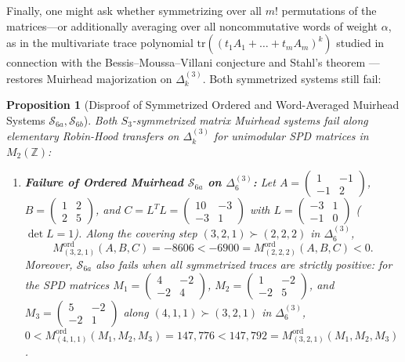 \documentclass[11pt,a4paper]{article}
\newtheorem{proposition}[theorem]{Proposition}
\theoremstyle{definition}
\theoremstyle{remark}
\newcommand{\tr}{\mathrm{tr}}
\newcommand{\DeltaLat}{\Delta}
\newcommand{\Mord}{M^{\mathrm{ord}}}
\begin{document}
Finally, one might ask whether symmetrizing over all $m!$ permutations of the matrices---or additionally averaging over all noncommutative words of weight $\alpha$, as in the multivariate trace polynomial $\tr((t_1 A_1 + \dots + t_m A_m)^k)$ studied in connection with the Bessis--Moussa--Villani conjecture and Stahl's theorem \cite{LiebSeiringer2004,Stahl2013}---restores Muirhead majorization on $\DeltaLat_k^{(3)}$. Both symmetrized systems still fail:

\begin{proposition}[Disproof of Symmetrized Ordered and Word-Averaged Muirhead Systems $\mathcal{S}_{6a}, \mathcal{S}_{6b}$]\label{prop:muirhead}
Both $S_3$-symmetrized matrix Muirhead systems fail along elementary Robin-Hood transfers on $\DeltaLat_k^{(3)}$ for unimodular SPD matrices in $M_2(\mathbb{Z})$:
\begin{enumerate}
\item \textbf{Failure of Ordered Muirhead $\mathcal{S}_{6a}$ on $\DeltaLat_6^{(3)}$:} Let $A = \begin{pmatrix} 1 & -1 \\ -1 & 2 \end{pmatrix}$, $B = \begin{pmatrix} 1 & 2 \\ 2 & 5 \end{pmatrix}$, and $C = L^T L = \begin{pmatrix} 10 & -3 \\ -3 & 1 \end{pmatrix}$ with $L = \begin{pmatrix} -3 & 1 \\ -1 & 0 \end{pmatrix}$ ($\det L = 1$). Along the covering step $(3, 2, 1) \succ (2, 2, 2)$ in $\DeltaLat_6^{(3)}$,
\[
\Mord_{(3,2,1)}(A, B, C) = -8606 < -6900 = \Mord_{(2,2,2)}(A, B, C) < 0.
\]
Moreover, $\mathcal{S}_{6a}$ also fails when all symmetrized traces are strictly positive: for the SPD matrices $M_1 = \begin{pmatrix} 4 & -2 \\ -2 & 4 \end{pmatrix}$, $M_2 = \begin{pmatrix} 1 & -2 \\ -2 & 5 \end{pmatrix}$, and $M_3 = \begin{pmatrix} 5 & -2 \\ -2 & 1 \end{pmatrix}$ along $(4, 1, 1) \succ (3, 2, 1)$ in $\DeltaLat_6^{(3)}$, $0 < \Mord_{(4,1,1)}(M_1,M_2,M_3) = 147{,}776 < 147{,}792 = \Mord_{(3,2,1)}(M_1,M_2,M_3)$.


\end{enumerate}
\end{proposition}
\end{document}

